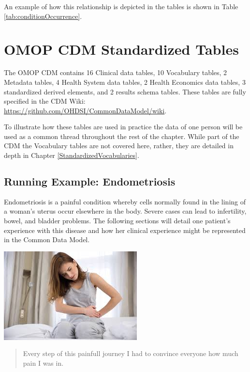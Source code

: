 \documentclass[11pt]{book}
\begin{document}
An example of how this relationship is depicted in the tables is shown
in Table \ref{tab:conditionOccurrence}.

\section{OMOP CDM Standardized
Tables}\label{omop-cdm-standardized-tables}

The OMOP CDM contains 16 Clinical data tables, 10 Vocabulary tables, 2
Metadata tables, 4 Health System data tables, 2 Health Economics data
tables, 3 standardized derived elements, and 2 results schema tables.
These tables are fully specified in the CDM Wiki:
\url{https://github.com/OHDSI/CommonDataModel/wiki}.

To illustrate how these tables are used in practice the data of one
person will be used as a common thread throughout the rest of the
chapter. While part of the CDM the Vocabulary tables are not covered
here, rather, they are detailed in depth in Chapter
\ref{StandardizedVocabularies}.

\subsection{Running Example:
Endometriosis}\label{running-example-endometriosis}

Endometriosis is a painful condition whereby cells normally found in the
lining of a woman's uterus occur elsewhere in the body. Severe cases can
lead to infertility, bowel, and bladder problems. The following sections
will detail one patient's experience with this disease and how her
clinical experience might be represented in the Common Data Model.

\begin{center}\includegraphics[width=0.5\linewidth]{images/CommonDataModel/Lauren} \end{center}

\begin{quote}
Every step of this painfull journey I had to convince everyone how much
pain I was in.
\end{quote}
\end{document}
